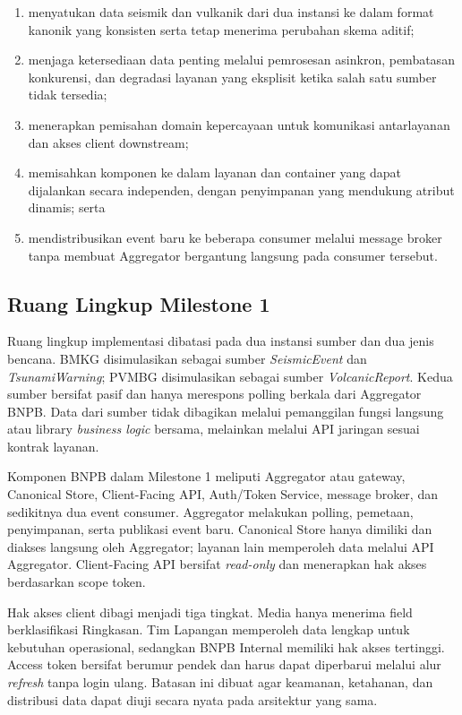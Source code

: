 \begin{enumerate}
  \item menyatukan data seismik dan vulkanik dari dua instansi ke dalam format
  kanonik yang konsisten serta tetap menerima perubahan skema aditif;
  \item menjaga ketersediaan data penting melalui pemrosesan asinkron,
  pembatasan konkurensi, dan degradasi layanan yang eksplisit ketika salah satu
  sumber tidak tersedia;
  \item menerapkan pemisahan domain kepercayaan untuk komunikasi antarlayanan
  dan akses client downstream;
  \item memisahkan komponen ke dalam layanan dan container yang dapat dijalankan
  secara independen, dengan penyimpanan yang mendukung atribut dinamis; serta
  \item mendistribusikan event baru ke beberapa consumer melalui message broker
  tanpa membuat Aggregator bergantung langsung pada consumer tersebut.
\end{enumerate}

\subsection{Ruang Lingkup Milestone 1}

Ruang lingkup implementasi dibatasi pada dua instansi sumber dan dua jenis
bencana. BMKG disimulasikan sebagai sumber \textit{SeismicEvent} dan
\textit{TsunamiWarning}; PVMBG disimulasikan sebagai sumber
\textit{VolcanicReport}. Kedua sumber bersifat pasif dan hanya merespons polling
berkala dari Aggregator BNPB. Data dari sumber tidak dibagikan melalui pemanggilan
fungsi langsung atau library \textit{business logic} bersama, melainkan melalui
API jaringan sesuai kontrak layanan.

Komponen BNPB dalam Milestone 1 meliputi Aggregator atau gateway, Canonical
Store, Client-Facing API, Auth/Token Service, message broker, dan sedikitnya dua
event consumer. Aggregator melakukan polling, pemetaan, penyimpanan, serta
publikasi event baru. Canonical Store hanya dimiliki dan diakses langsung oleh
Aggregator; layanan lain memperoleh data melalui API Aggregator. Client-Facing
API bersifat \textit{read-only} dan menerapkan hak akses berdasarkan scope token.

Hak akses client dibagi menjadi tiga tingkat. Media hanya menerima field
berklasifikasi Ringkasan. Tim Lapangan memperoleh data lengkap untuk kebutuhan
operasional, sedangkan BNPB Internal memiliki hak akses tertinggi. Access token
bersifat berumur pendek dan harus dapat diperbarui melalui alur \textit{refresh}
tanpa login ulang. Batasan ini dibuat agar keamanan, ketahanan, dan distribusi
data dapat diuji secara nyata pada arsitektur yang sama.

